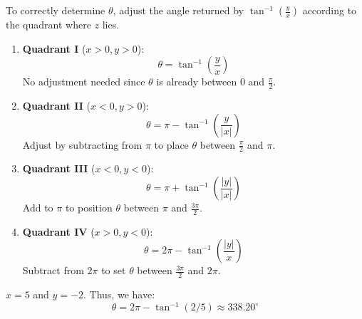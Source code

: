 \documentclass[a4paper,12pt]{article} %
\theoremstyle{definition}
\theoremstyle{plain}
\begin{document}
  To correctly determine \( \theta \), adjust the angle returned by \(\tan^{-1}\left(\frac{y}{x}\right)\) according to the quadrant where \( z \) lies.
  
  \begin{enumerate}
      \item \textbf{Quadrant I} (\( x > 0, y > 0 \)):
      \[
      \theta = \tan^{-1}\left(\frac{y}{x}\right)
      \]
      No adjustment needed since \( \theta \) is already between \( 0 \) and \( \frac{\pi}{2} \).
  
      \item \textbf{Quadrant II} (\( x < 0, y > 0 \)):
      \[
      \theta = \pi - \tan^{-1}\left(\frac{y}{|x|}\right)
      \]
      Adjust by subtracting from \( \pi \) to place \( \theta \) between \( \frac{\pi}{2} \) and \( \pi \).
  
      \item \textbf{Quadrant III} (\( x < 0, y < 0 \)):
      \[
      \theta = \pi + \tan^{-1}\left(\frac{|y|}{|x|}\right)
      \]
      Add to \( \pi \) to position \( \theta \) between \( \pi \) and \( \frac{3\pi}{2} \).
  
      \item \textbf{Quadrant IV} (\( x > 0, y < 0 \)):
      \[
      \theta = 2\pi - \tan^{-1}\left(\frac{|y|}{x}\right)
      \]
      Subtract from \( 2\pi \) to set \( \theta \) between \( \frac{3\pi}{2} \) and \( 2\pi \).
  \end{enumerate}

\begin{examplebox}[Let $z = 5 - 2i$]
  $x = 5$ and $y = -2$. Thus, we have:
  $$\theta = 2\pi - \tan^{-1}({2/5}) \approx 338.20^\circ$$
  \begin{center}
  \end{center}

\end{examplebox}
\end{document}
